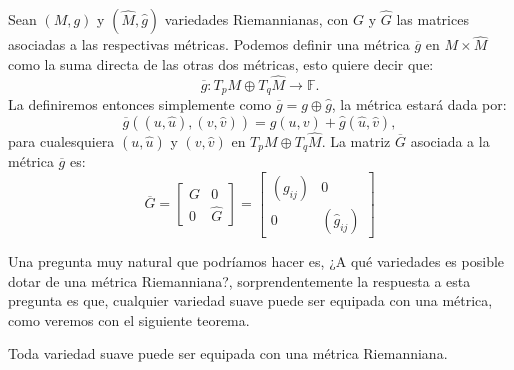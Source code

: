 \begin{example}\label{Ejemplo: Métrica - Producto de Variedades}
	Sean $(M,g)$ y $(\hat{M}, \hat{g})$ variedades Riemannianas, con $G$ y $\hat{G}$ las matrices asociadas a las respectivas métricas. Podemos definir una métrica $\overline{g}$ en $M \times \hat{M}$ como la suma directa de las otras dos métricas, esto quiere decir que:
	\[
		\overline{g}: T_{p}M \oplus T_{q}\hat{M} \to \mathbb{F}.
	\]
  La definiremos entonces simplemente como $\overline{g} = g \oplus \hat{g}$, la métrica estará dada por:
	\[
		\overline{g}((u,\hat{u}),(v,\hat{v})) = g(u,v) + \hat{g}(\hat{u},\hat{v}),
	\]
	para cualesquiera $(u,\hat{u})$ y $(v,\hat{v})$ en $T_{p}M \oplus T_{q}\hat{M}$. La matriz $\overline{G}$ asociada a la métrica $\overline{g}$ es:
	\[
		\overline{G} = \begin{bmatrix}
			G & 0       \\
			0 & \hat{G}
		\end{bmatrix} = \begin{bmatrix}
			(g_{ij}) & 0              \\
			0        & (\hat{g}_{ij})
		\end{bmatrix} \]
\end{example}

Una pregunta muy natural que podríamos hacer es, ¿A qué variedades es posible dotar de una métrica Riemanniana?, sorprendentemente la respuesta a esta pregunta es que, cualquier variedad suave puede ser equipada con una métrica, como veremos con el siguiente teorema.

\begin{theorem}
	Toda variedad suave puede ser equipada con una métrica Riemanniana.
\end{theorem}

